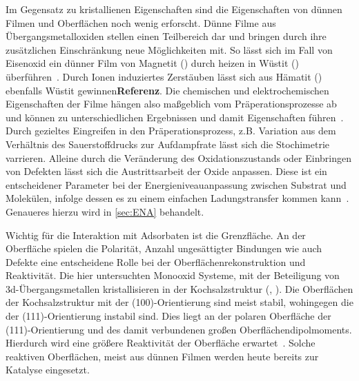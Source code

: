         Im Gegensatz zu kristallienen Eigenschaften sind die Eigenschaften von dünnen Filmen und Oberflächen noch wenig erforscht.
        Dünne Filme aus Übergangsmetalloxiden stellen einen Teilbereich dar und bringen durch ihre zusätzlichen Einschränkung neue Möglichkeiten mit.
        So lässt sich im Fall von Eisenoxid ein dünner Film von Magnetit () durch heizen in Wüstit () überführen~\cite{FeO_1}.
        Durch Ionen induziertes Zerstäuben lässt sich aus Hämatit () ebenfalls Wüstit gewinnen\textbf{Referenz}.
        Die chemischen und elektrochemischen Eigenschaften der Filme hängen also maßgeblich vom Präperationsprozesse ab und können zu unterschiedlichen Ergebnissen und damit Eigenschaften führen~\cite{Uni-Tübingen}.
        Durch gezieltes Eingreifen in den Präperationsprozess, z.B. Variation aus dem Verhältnis des Sauerstoffdrucks zur Aufdampfrate lässt sich die Stochimetrie varrieren.
        Alleine durch die Veränderung des Oxidationszustands oder Einbringen von Defekten lässt sich die Austrittsarbeit der Oxide anpassen.
        Diese ist ein entscheidener Parameter bei der Energieniveauanpassung zwischen Substrat und Molekülen, infolge dessen es zu einem einfachen Ladungstransfer kommen kann~\cite{IF_3}.
        Genaueres hierzu wird in \autoref{sec:ENA} behandelt.

        Wichtig für die Interaktion mit Adsorbaten ist die Grenzfläche.
        An der Oberfläche spielen die Polarität, Anzahl ungesättigter Bindungen wie auch Defekte eine entscheidene Rolle bei der Oberflächenrekonstruktion und Reaktivität.
        Die hier untersuchten Monooxid Systeme, mit der Beteiligung von 3d-Übergangsmetallen kristallisieren in der Kochsalzstruktur (, ).
        Die Oberflächen der Kochsalzstruktur mit der (100)-Orientierung sind meist stabil, wohingegen die der (111)-Orientierung instabil sind.
        Dies liegt an der polaren Oberfläche der (111)-Orientierung und des damit verbundenen großen Oberflächendipolmoments.
        Hierdurch wird eine größere Reaktivität der Oberfläche erwartet~\cite{Cappus et al. - 1993 - Hydroxyl groups on oxide surfaces NiO(100), NiO(1.pdf}.
        Solche reaktiven Oberflächen, meist aus dünnen Filmen werden heute bereits zur Katalyse eingesetzt.

